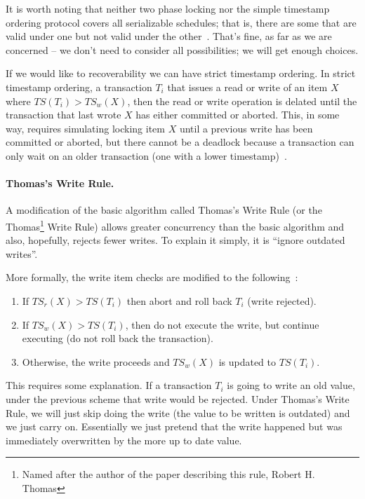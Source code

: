 It is worth noting that neither two phase locking nor the simple timestamp ordering protocol covers all serializable schedules; that is, there are some that are valid under one but not valid under the other~\cite{fds}. That's fine, as far as we are concerned -- we don't need to consider all possibilities; we will get enough choices.

If we would like to recoverability we can have strict timestamp ordering. In strict timestamp ordering, a transaction $T_{i}$ that issues a read or write of an item $X$ where $T\!S(T_{i}) > T\!S_{w}(X)$, then the read or write operation is delated until the transaction that last wrote $X$ has either committed or aborted. This, in some way, requires simulating locking item $X$ until a previous write has been committed or aborted, but there cannot be a deadlock because a transaction can only wait on an older transaction (one with a  lower timestamp)~\cite{fds}.

\paragraph{Thomas's Write Rule.} A modification of the basic algorithm called Thomas's Write Rule (or the Thomas\footnote{Named after the author of the paper describing this rule, Robert H. Thomas} Write Rule) allows greater concurrency than the basic algorithm and also, hopefully, rejects fewer writes. To explain it simply, it is ``ignore outdated writes''.

More formally, the write item checks are modified to the following~\cite{fds}:
\begin{enumerate}
	\item If $T\!S_{r}(X) > T\!S(T_{i})$ then abort and roll back $T_{i}$ (write rejected).
	\item If $T\!S_{w}(X) > T\!S(T_{i})$, then do not execute the write, but continue executing (do not roll back the transaction).
	\item Otherwise, the write proceeds and $T\!S_{w}(X)$ is updated to $T\!S(T_{i})$. 
\end{enumerate}

This requires some explanation. If a transaction $T_{i}$ is going to write an old value, under the previous scheme that write would be rejected. Under Thomas's Write Rule, we will just skip doing the write (the value to be written is outdated) and we just carry on. Essentially we just pretend that the write happened but was immediately overwritten by the more up to date value. 





